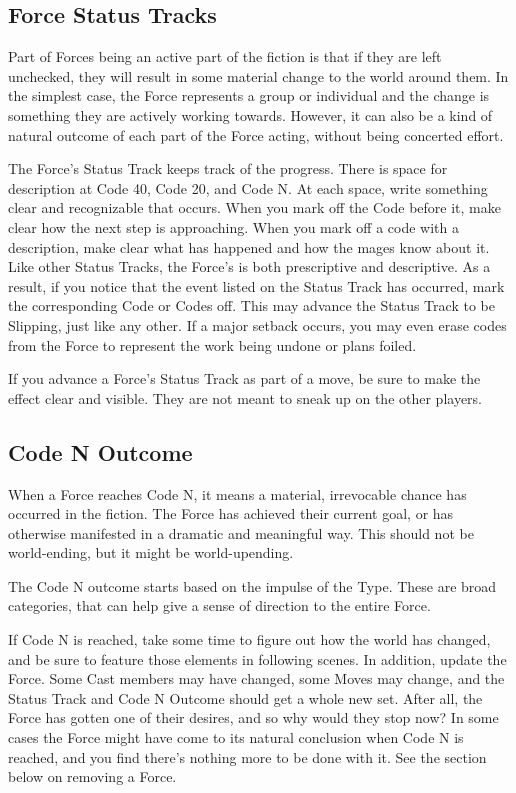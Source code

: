 \documentclass[
  oneside,
  statementpaper,
  9pt]{memoir}
\begin{document}
\hypertarget{force-status-tracks}{%
\subsection{Force Status Tracks}\label{force-status-tracks}}

Part of Forces being an active part of the fiction is that if they are
left unchecked, they will result in some material change to the world
around them. In the simplest case, the Force represents a group or
individual and the change is something they are actively working
towards. However, it can also be a kind of natural outcome of each part
of the Force acting, without being concerted effort.

The Force's Status Track keeps track of the progress. There is space for
description at Code 40, Code 20, and Code N. At each space, write
something clear and recognizable that occurs. When you mark off the Code
before it, make clear how the next step is approaching. When you mark
off a code with a description, make clear what has happened and how the
mages know about it. Like other Status Tracks, the Force's is both
prescriptive and descriptive. As a result, if you notice that the event
listed on the Status Track has occurred, mark the corresponding Code or
Codes off. This may advance the Status Track to be Slipping, just like
any other. If a major setback occurs, you may even erase codes from the
Force to represent the work being undone or plans foiled.

If you advance a Force's Status Track as part of a move, be sure to make
the effect clear and visible. They are not meant to sneak up on the
other players.

\hypertarget{code-n-outcome}{%
\subsection{Code N Outcome}\label{code-n-outcome}}

When a Force reaches Code N, it means a material, irrevocable chance has
occurred in the fiction. The Force has achieved their current goal, or
has otherwise manifested in a dramatic and meaningful way. This should
not be world-ending, but it might be world-upending.

The Code N outcome starts based on the impulse of the Type. These are
broad categories, that can help give a sense of direction to the entire
Force.

If Code N is reached, take some time to figure out how the world has
changed, and be sure to feature those elements in following scenes. In
addition, update the Force. Some Cast members may have changed, some
Moves may change, and the Status Track and Code N Outcome should get a
whole new set. After all, the Force has gotten one of their desires, and
so why would they stop now? In some cases the Force might have come to
its natural conclusion when Code N is reached, and you find there's
nothing more to be done with it. See the section below on removing a
Force.
\end{document}

